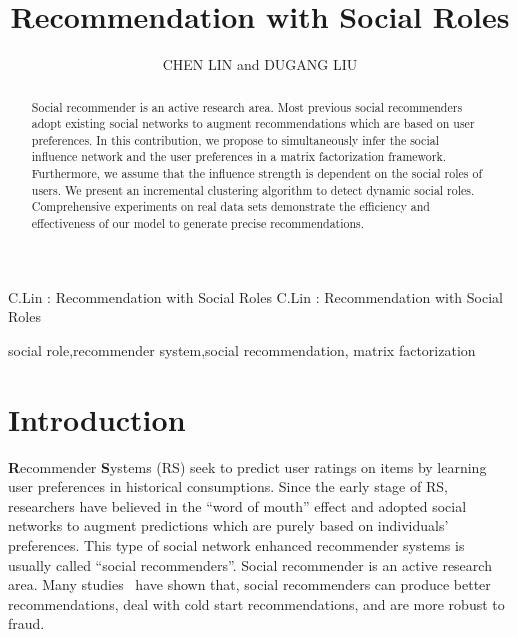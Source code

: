 \documentclass{ieeeaccess}
\begin{document}

\title{Recommendation with Social Roles}
\author{\uppercase{Chen Lin }
and \uppercase{Dugang Liu }
\address[1]{School or Information Science and Technology, Xiamen University, China (e-mail: chenlin@xmu.edu.cn)}
\address[2]{School or Information Science and Technology, Xiamen University, China (e-mail: dgliu@stu.xmu.edu.cn)}
}

\markboth
{C.Lin \headeretal: Recommendation with Social Roles}
{C.Lin \headeretal: Recommendation with Social Roles}


\begin{abstract}
Social recommender is an active research area. Most previous social recommenders adopt existing social networks to augment recommendations which are based on user preferences. In this contribution, we propose to simultaneously infer the social influence network and the user preferences in a matrix factorization framework. Furthermore, we assume that the influence strength is dependent on the social roles of users. We present an incremental clustering algorithm to detect dynamic social roles. Comprehensive experiments on real data sets demonstrate the efficiency and effectiveness of our model to generate precise recommendations.
\end{abstract}

\begin{keywords}
social role,recommender system,social recommendation, matrix factorization
\end{keywords}

\titlepgskip=-15pt

\maketitle

\section{Introduction}\label{sec:introduction}
\textbf{R}ecommender \textbf{S}ystems (RS) seek to predict user ratings on items by learning user preferences in historical consumptions. Since the early stage of RS, researchers have believed in the ``word of mouth'' effect and adopted social networks to augment predictions which are purely based on individuals' preferences. This type of social network enhanced recommender systems is usually called ``social recommenders''. Social recommender is an active research area. Many studies~\cite{ma2008sorec,ma2009learning,Ma2009Learninga,Jamali2009TrustWalker,AuYeung2011Strength,Ma2011Recommender,Jamali2010matrix,Jamali2011Generalized,Yang2013Social,Krohn-Grimberghe2012Multi,Yao2014Modeling,Forsati2014Matrix,Forsati2015PushTrust} have shown that, social recommenders can produce better recommendations, deal with cold start recommendations, and are more robust to fraud.
\end{document}
